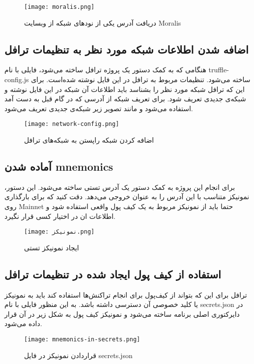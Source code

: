 \begin{figure}[ht]
\centerline{\texttt{[image: moralis.png]}}
\caption{دریافت آدرس یکی از نود‌های شبکه از وبسایت Moralis}
\label{fig:moralis}
\end{figure}

\subsection{اضافه شدن اطلاعات شبکه مورد نظر به تنظیمات ترافل}
هنگامی که به کمک دستور
یک پروژه ترافل ساخته می‌شود، فایلی با نام truffle-config.js ساخته می‌شود. تنظیمات مربوط به ترافل در این فایل نوشته شده‌است. برای این که ترافل شبکه مورد نظر را بشناسد باید اطلاعات آن شبکه در این فایل نوشته و شبکه‌ی جدیدی تعریف شود. برای تعریف شبکه از آدرسی که در گام قبل به دست آمد استفاده می‌شود و مانند تصویر زیر شبکه‌ی جدیدی تعریف می‌شود.

\begin{figure}[ht]
\centerline{\texttt{[image: network-config.png]}}
\caption{اضافه کردن شبکه راپستن به شبکه‌های ترافل}
\label{fig:network-config}
\end{figure}


\subsection{آماده شدن \gls{mnemonics}}
برای انجام این پروژه به کمک دستور
یک آدرس تستی ساخته می‌شود. این دستور، نمونیکز متناسب با این آدرس را به عنوان خروجی می‌دهد. دقت کنید که برای بارگذاری روی
\gls{Mainnet}
حتما باید از نمونیکز مربوط به یک کیف پول واقعی استفاده شود و اطلاعات ان در اختیار کسی قرار نگیرد.

\begin{figure}[ht]
\centerline{\texttt{[image: نمونیکز.png]}}
\caption{ایجاد نمونیکز تستی}
\label{fig:نمونیکز}
\end{figure}


\subsection{استفاده از کیف پول ایجاد شده در تنظیمات ترافل}
ترافل برای این که بتواند از کیف‌پول برای انجام تراکنش‌ها استفاده کند باید به نمونیکز یا کلید خصوصی آن دسترسی داشته باشد. به این منظور فایلی با نام secrets.json در دایرکتوری اصلی برنامه ساخته می‌شود و نمونیکز کیف پول به شکل زیر در آن قرار داده می‌شود.

\begin{figure}[ht]
\centerline{\texttt{[image: mnemonics-in-secrets.png]}}
\caption{قراردادن نمونیکز در فایل secrets.json}
\label{fig:mnemonics-in-secrets}
\end{figure}

